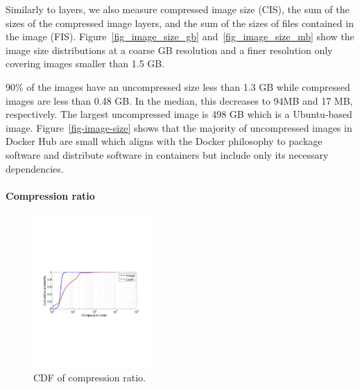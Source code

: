 Similarly to layers, we also measure compressed image size
(CIS), \ie the sum of the sizes of the compressed image layers, and the sum of the
sizes of files contained in the image (FIS). Figure~\ref{fig_image_size_gb}
and~\ref{fig_image_size_mb} show the image size distributions at a coarse GB resolution
and a finer resolution only covering images smaller than 1.5 GB.

90\% of the images have an uncompressed size less than 1.3 GB while compressed images
are less than 0.48 GB. In the median, this decreases to 94MB and 17 MB, respectively.
The largest uncompressed image is 498 GB which is a Ubuntu-based image.
Figure~\ref{fig-image-size} shows that the majority of uncompressed images in Docker Hub are
small which aligns with the Docker philosophy to package software and distribute
software in containers but include only its necessary dependencies.


\paragraph{Compression ratio}
\begin{figure}
	\centering
	\includegraphics[width=0.4\textwidth]{graphs/compress-ratio-cdf.pdf}
	\caption{CDF of compression ratio.
	}
	\label{fig:compress-ratio}
\end{figure}

